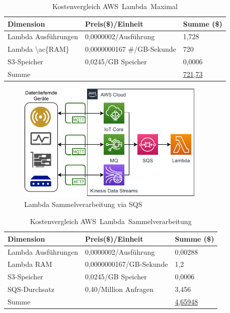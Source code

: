 
\begin{table}[H]
\centering
\begin{tabular}{|l|l|l|}
\hline
Dimension & Preis(\$)/Einheit & Summe (\$) \\ \hline
Lambda Ausführungen & 0,0000002/Ausführung & 1,728 \\ \hline
Lambda \textbackslash{}ac\{RAM\} & 0,0000000167 \#/GB-Sekunde & 720 \\ \hline
\ac{S3}-Speicher & 0,0245/GB Speicher & 0,0006 \\ \hline
Summe &  & \underline{721,73} \\ \hline
\end{tabular}
\caption{Kostenvergleich AWS~Lambda~Maximal}
\label{tab:kostenvergleich-AWS~Lambda~Maximal}
\end{table}

\begin{figure}[H]
\centering
\includegraphics[width=0.8\textwidth]{graphics/Lambda-Batch.pdf}
\caption{Lambda Sammelverarbeitung via SQS}
\label{abb:Lambda-Batch}
\end{figure}


\begin{table}[H]
\centering
\begin{tabular}{|l|l|l|}
\hline
Dimension & Preis(\$)/Einheit & Summe (\$) \\ \hline
Lambda Ausführungen & 0,0000002/Ausführung & 0,00288 \\ \hline
Lambda \ac{RAM} & 0,0000000167/GB-Sekunde & 1,2 \\ \hline
\ac{S3}-Speicher & 0,0245/GB Speicher & 0,0006 \\ \hline
\ac{SQS}-Durchsatz & 0,40/Million Anfragen & 3,456 \\\hline
Summe &  & \underline{4,65948} \\ \hline
\end{tabular}
\caption{Kostenvergleich AWS~Lambda~Sammelverarbeitung}
\label{tab:kostenvergleich-AWS~Lambda~Sammelverarbeitung}
\end{table}

